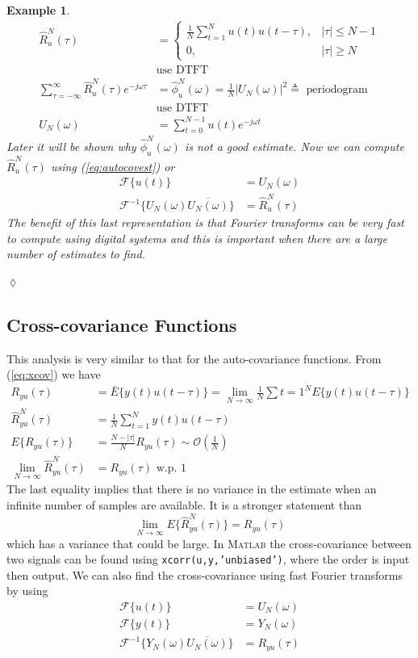 \documentclass[lecture,12pt,]{pcms-l}
\theoremstyle{example}
\newtheorem{example}{Example}[section]
\newcommand{\w}{\omega}
\newcommand{\ruhat}{\hat{R}_u^N(\tau)}
\newcommand{\ryuhat}{\hat{R}_{yu}^N(\tau)}
\newcommand{\phiuhat}{\hat{\phi}_u^N(\omega)}
\begin{document}
\begin{example}
\begin{align*}
\ruhat &= \begin{cases} \frac{1}{N}\sum_{t=1}^Nu(t)u(t-\tau), & |\tau|\leq N-1 \\ 0, & |\tau|\geq N \end{cases} \\
&\text{use DTFT} \\
\sum_{\tau=-\infty}^\infty\ruhat e^{-j\w\tau} &= \phiuhat = \frac{1}{N}\left|U_N(\w)\right|^2 \triangleq \text{ periodogram} \\
&\text{use DTFT} \\
U_N(\w) &= \sum_{t=0}^{N-1}u(t)e^{-j\w t}
\end{align*}
Later it will be shown why $\phiuhat$ is \textit{not} a good estimate. Now we can compute $\ruhat$ using (\ref{eq:autocovest}) or
\begin{align*}
\mathcal{F}\{u(t)\} &= U_N(\w) \\
\mathcal{F}^{-1}\{U_N(\w)\overline{U_N(\w)}\} &= \ruhat
\end{align*}
The benefit of this last representation is that Fourier transforms can be \textit{very} fast to compute using digital systems and this is important when there are a large number of estimates to find.
\end{example}
$\lozenge$

\subsection{Cross-covariance Functions}
This analysis is very similar to that for the auto-covariance functions. From (\ref{eq:xcov}) we have
\begin{align*}
R_{yu}(\tau) &= \bar{E}\{y(t)u(t-\tau)\} = \lim_{N\to\infty}\frac{1}{N}\sum{t=1}^N E\{y(t)u(t-\tau)\} \\
\ryuhat &= \frac{1}{N}\sum_{t=1}^Ny(t)u(t-\tau) \\
E\{R_{yu}(\tau)\} &= \frac{N-|\tau|}{N}R_{yu}(\tau) \sim \mathcal{O}(\frac{1}{N}) \\
\lim_{N\to\infty}\ryuhat &= R_{yu}(\tau) \text{ w.p. } 1
\end{align*}
The last equality implies that there is no variance in the estimate when an infinite number of samples are available. It is a stronger statement than
$$\lim_{N\to\infty}E\{\ryuhat\} = R_{yu}(\tau)$$
which has a variance that could be large. In \textsc{Matlab} the cross-covariance between two signals can be found using \texttt{xcorr(u,y,'unbiased')}, where the order is input then output. We can also find the cross-covariance using fast Fourier transforms by using
\begin{align*}
\mathcal{F}\{u(t)\} &= U_N(\w) \\
\mathcal{F}\{y(t)\} &= Y_N(\w) \\
\mathcal{F}^{-1}\{Y_N(\w)\overline{U_N(\w)}\} &= R_{yu}(\tau)
\end{align*}
\end{document}
